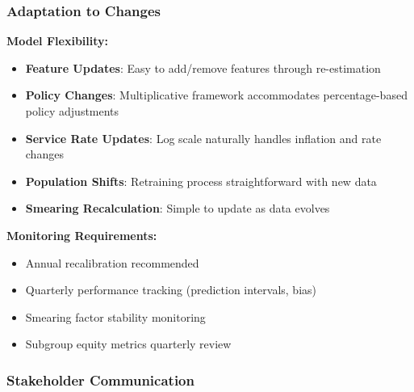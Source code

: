 \subsubsection{Adaptation to Changes}

\textbf{Model Flexibility:}
\begin{itemize}
    \item \textbf{Feature Updates}: Easy to add/remove features through re-estimation
    \item \textbf{Policy Changes}: Multiplicative framework accommodates percentage-based policy adjustments
    \item \textbf{Service Rate Updates}: Log scale naturally handles inflation and rate changes
    \item \textbf{Population Shifts}: Retraining process straightforward with new data
    \item \textbf{Smearing Recalculation}: Simple to update as data evolves
\end{itemize}

\textbf{Monitoring Requirements:}
\begin{itemize}
    \item Annual recalibration recommended
    \item Quarterly performance tracking (prediction intervals, bias)
    \item Smearing factor stability monitoring
    \item Subgroup equity metrics quarterly review
\end{itemize}

\subsubsection{Stakeholder Communication}

